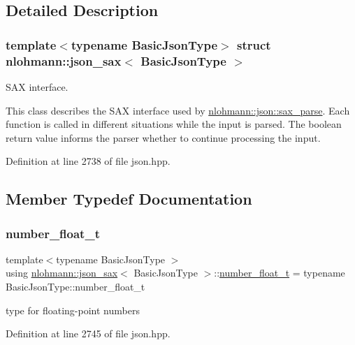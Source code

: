 \subsection{Detailed Description}
\subsubsection*{template$<$typename Basic\+Json\+Type$>$\newline
struct nlohmann\+::json\+\_\+sax$<$ Basic\+Json\+Type $>$}

S\+AX interface. 

This class describes the S\+AX interface used by \mbox{\hyperlink{classnlohmann_1_1basic__json_a8a3dd150c2d1f0df3502d937de0871db}{nlohmann\+::json\+::sax\+\_\+parse}}. Each function is called in different situations while the input is parsed. The boolean return value informs the parser whether to continue processing the input. 

Definition at line 2738 of file json.\+hpp.



\subsection{Member Typedef Documentation}
\mbox{\label{structnlohmann_1_1json__sax_a390c209bffd8c4800c8f3076dc465a20}} 
\subsubsection{\texorpdfstring{number\_float\_t}{number\_float\_t}}
{\footnotesize\ttfamily template$<$typename Basic\+Json\+Type $>$ \\
using \mbox{\hyperlink{structnlohmann_1_1json__sax}{nlohmann\+::json\+\_\+sax}}$<$ Basic\+Json\+Type $>$\+::\mbox{\hyperlink{structnlohmann_1_1json__sax_a390c209bffd8c4800c8f3076dc465a20}{number\+\_\+float\+\_\+t}} =  typename Basic\+Json\+Type\+::number\+\_\+float\+\_\+t}



type for floating-\/point numbers 



Definition at line 2745 of file json.\+hpp.

